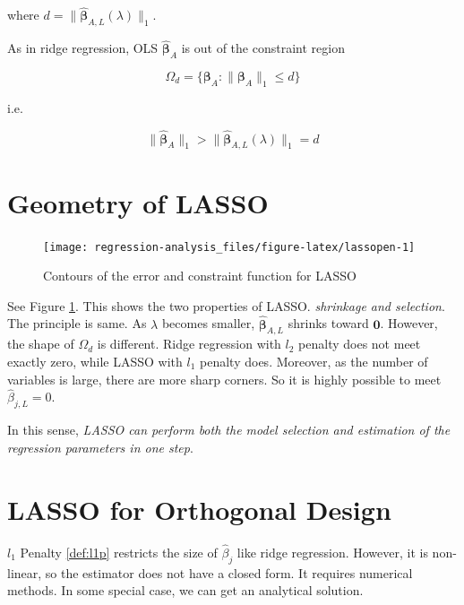 \documentclass[]{book}
\theoremstyle{definition}
\theoremstyle{definition}
\theoremstyle{definition}
\theoremstyle{remark}
\begin{document}
where \(d = \lVert \boldsymbol{\hat\beta}_{A,L}(\lambda) \rVert_1\).

As in ridge regression, OLS \(\boldsymbol{\hat\beta}_{A}\) is out of the constraint region

\[\Omega_d = \{ \boldsymbol\beta_A : \lVert \boldsymbol\beta_A \rVert_1 \le d \}\]

i.e.

\[\lVert \boldsymbol{\hat\beta}_{A} \rVert_1 > \lVert \boldsymbol{\hat\beta}_{A, L}(\lambda) \rVert_1 = d\]

\hypertarget{geometry-of-lasso}{%
\section{Geometry of LASSO}\label{geometry-of-lasso}}

\begin{figure}[H]

{\centering \texttt{[image: regression-analysis\_files/figure-latex/lassopen-1]} 

}

\caption{Contours of the error and constraint function for LASSO}\label{fig:lassopen}
\end{figure}

See Figure \ref{fig:lassopen}. This shows the two properties of LASSO. \emph{shrinkage and selection}. The principle is same. As \(\lambda\) becomes smaller, \(\boldsymbol{\hat\beta}_{A,L}\) shrinks toward \(\mathbf{0}\). However, the shape of \(\Omega_d\) is different. Ridge regression with \(l_2\) penalty does not meet exactly zero, while LASSO with \(l_1\) penalty does. Moreover, as the number of variables is large, there are more sharp corners. So it is highly possible to meet \(\hat\beta_{j, L} = 0\).

In this sense, \emph{LASSO can perform both the model selection and estimation of the regression parameters in one step}.

\hypertarget{lasso-for-orthogonal-design}{%
\section{LASSO for Orthogonal Design}\label{lasso-for-orthogonal-design}}

\(l_1\) Penalty \ref{def:l1p} restricts the size of \(\hat\beta_j\) like ridge regression. However, it is non-linear, so the estimator does not have a closed form. It requires numerical methods. In some special case, we can get an analytical solution.
\end{document}
